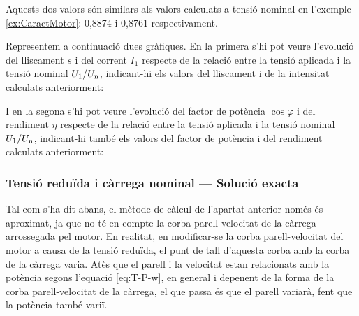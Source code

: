 \begin{exemple}
	Aquests dos valors són similars als valors calculats a tensió nominal en  l'exemple \ref{ex:CaractMotor}: 0,8874 i 0,8761 respectivament.
	
	Representem a continuació dues gràfiques. En la primera s'hi pot veure  l'evolució del lliscament $s$ i del corrent $I_1$ respecte de la relació entre la tensió aplicada i la tensió nominal $U_1/U_\mathrm{n}$, indicant-hi els valors del lliscament i de la intensitat calculats anteriorment:
	\begin{center}
		
	\end{center}

	I en la segona s'hi pot veure l'evolució del factor de potència $\cos\varphi$ i del rendiment $\eta$ respecte de la relació entre la tensió aplicada i la tensió nominal $U_1/U_\mathrm{n}$, indicant-hi també  els valors del factor de potència i del rendiment calculats anteriorment:
	\begin{center}
		
	\end{center}	
\end{exemple}

\subsubsection{Tensió reduïda i càrrega nominal --- Solució exacta}

Tal com s'ha dit abans, el mètode de càlcul de l'apartat anterior només és aproximat, ja que no té en compte la corba parell-velocitat de la càrrega arrossegada pel motor. En realitat, en modificar-se la corba parell-velocitat del motor a causa de la tensió reduïda, el punt de tall d'aquesta corba amb la corba de la càrrega varia. Atès que el parell i la velocitat estan relacionats amb la potència segons l'equació  \eqref{eq:T-P-w}, en general i depenent de la forma de la corba parell-velocitat de la càrrega, el que passa és que el parell variarà, fent que la potència també variï.

